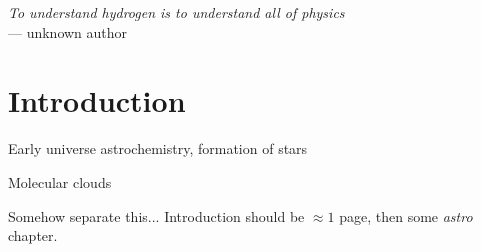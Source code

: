 \begin{flushright}
\textsl{To understand hydrogen is to understand all of physics }\\
 \medskip{}
 --- unknown author 
\par\end{flushright}

\bigskip{}
\begingroup
\let\clearpage\relax
\let\cleardoublepage\relax


\chapter{Introduction}

\label{ch:Introduction}
Early universe astrochemistry, formation of stars

Molecular clouds

Somehow separate this... Introduction should be $\approx1$ page, then some {\em astro} chapter.

\endgroup
